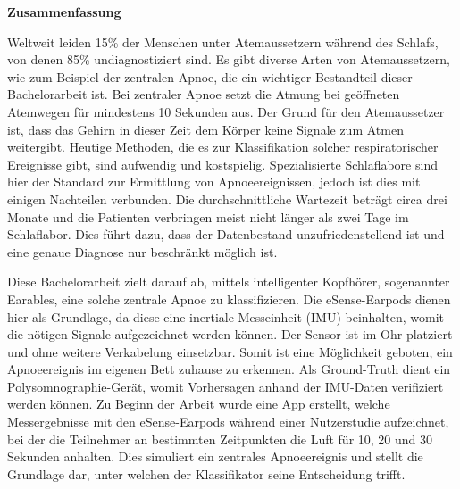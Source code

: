 % 
% 

\vspace*{1em}
\begin{center}
	\textbf{Zusammenfassung}
\end{center}
\par
Weltweit leiden 15\% der Menschen unter Atemaussetzern während des Schlafs, von denen 85\% undiagnostiziert sind. 
Es gibt diverse Arten von Atemaussetzern, wie zum Beispiel der zentralen Apnoe, die ein wichtiger Bestandteil dieser Bachelorarbeit ist.
Bei zentraler Apnoe setzt die Atmung bei geöffneten Atemwegen für mindestens 10 Sekunden aus. Der Grund für den Atemaussetzer ist, dass das Gehirn in dieser Zeit dem Körper keine Signale zum Atmen weitergibt.
Heutige Methoden, die es zur Klassifikation solcher respiratorischer Ereignisse gibt, sind aufwendig und kostspielig. 
Spezialisierte Schlaflabore sind hier der Standard zur Ermittlung von Apnoeereignissen, jedoch ist dies mit einigen Nachteilen verbunden.
Die durchschnittliche Wartezeit beträgt circa drei Monate und die Patienten verbringen meist nicht länger als zwei Tage im Schlaflabor.
Dies führt dazu, dass der Datenbestand unzufriedenstellend ist und eine genaue Diagnose nur beschränkt möglich ist.

Diese Bachelorarbeit zielt darauf ab, mittels intelligenter Kopfhörer, sogenannter Earables, eine solche zentrale Apnoe zu klassifizieren.
Die eSense-Earpods dienen hier als Grundlage, da diese eine inertiale Messeinheit (IMU) beinhalten, womit die nötigen Signale aufgezeichnet werden können. 
Der Sensor ist im Ohr platziert und ohne weitere Verkabelung einsetzbar.
Somit ist eine Möglichkeit geboten, ein Apnoeereignis im eigenen Bett zuhause zu erkennen.
Als Ground-Truth dient ein Polysomnographie-Gerät, womit Vorhersagen anhand der IMU-Daten verifiziert werden können.
Zu Beginn der Arbeit wurde eine App erstellt, welche Messergebnisse mit den eSense-Earpods während einer Nutzerstudie aufzeichnet, bei der die Teilnehmer an bestimmten Zeitpunkten die Luft für 10, 20 und 30 Sekunden anhalten.
Dies simuliert ein zentrales Apnoeereignis und stellt die Grundlage dar, unter welchen der Klassifikator seine Entscheidung trifft.

